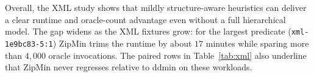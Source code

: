 \documentclass[9pt]{extarticle}
\begin{document}
Overall, the XML study shows that mildly structure-aware heuristics can deliver a clear runtime and oracle-count advantage even without a full hierarchical model. The gap widens as the XML fixtures grow: for the largest predicate (\verb|xml-1e9bc83-5:1|) ZipMin trims the runtime by about $17$ minutes while sparing more than $4{,}000$ oracle invocations. The paired rows in Table~\ref{tab:xml} also underline that ZipMin never regresses relative to ddmin on these workloads.
\end{document}
